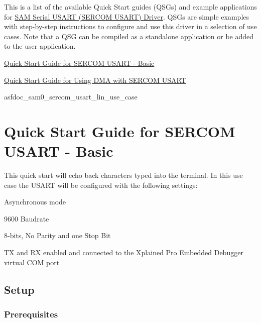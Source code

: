 This is a list of the available Quick Start guides (Q\+S\+Gs) and example applications for \hyperlink{group__asfdoc__sam0__sercom__usart__group}{S\+A\+M Serial U\+S\+A\+R\+T (S\+E\+R\+C\+O\+M U\+S\+A\+R\+T) Driver}. Q\+S\+Gs are simple examples with step-\/by-\/step instructions to configure and use this driver in a selection of use cases. Note that a Q\+S\+G can be compiled as a standalone application or be added to the user application.


\begin{DoxyItemize}
\item \hyperlink{asfdoc_sam0_sercom_usart_basic_use_case}{Quick Start Guide for S\+E\+R\+C\+O\+M U\+S\+A\+R\+T -\/ Basic}
\item \hyperlink{asfdoc_sam0_sercom_usart_dma_use_case}{Quick Start Guide for Using D\+M\+A with S\+E\+R\+C\+O\+M U\+S\+A\+R\+T}
\item asfdoc\+\_\+sam0\+\_\+sercom\+\_\+usart\+\_\+lin\+\_\+use\+\_\+case 
\end{DoxyItemize}\hypertarget{asfdoc_sam0_sercom_usart_basic_use_case}{}\section{Quick Start Guide for S\+E\+R\+C\+O\+M U\+S\+A\+R\+T -\/ Basic}\label{asfdoc_sam0_sercom_usart_basic_use_case}
This quick start will echo back characters typed into the terminal. In this use case the U\+S\+A\+R\+T will be configured with the following settings\+:
\begin{DoxyItemize}
\item Asynchronous mode
\item 9600 Baudrate
\item 8-\/bits, No Parity and one Stop Bit
\item T\+X and R\+X enabled and connected to the Xplained Pro Embedded Debugger virtual C\+O\+M port
\end{DoxyItemize}\hypertarget{asfdoc_sam0_sercom_usart_basic_use_case_asfdoc_sam0_sercom_usart_basic_use_case_setup}{}\subsection{Setup}\label{asfdoc_sam0_sercom_usart_basic_use_case_asfdoc_sam0_sercom_usart_basic_use_case_setup}
\hypertarget{asfdoc_sam0_sercom_usart_basic_use_case_asfdoc_sam0_sercom_usart_basic_use_case_prereq}{}\subsubsection{Prerequisites}\label{asfdoc_sam0_sercom_usart_basic_use_case_asfdoc_sam0_sercom_usart_basic_use_case_prereq}
